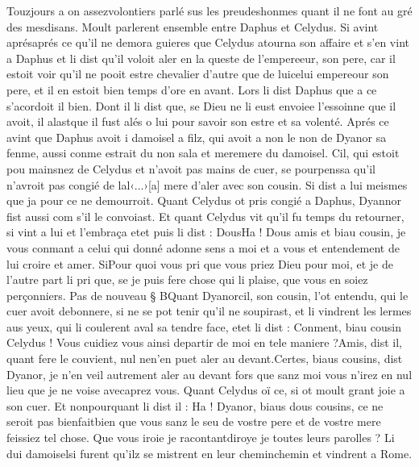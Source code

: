 \documentclass{article}
\begin{document}
\begin{pages}
      Touzjours a on assezvolontiers parlé sus les preudeshonmes quant 
      il ne font au gré des mesdisans.
   Moult parlerent ensemble entre Daphus et Celydus. 
   Si avint aprésaprés ce qu’il ne demora guieres que  
   Celydus atourna son affaire et s’en vint a 
   Daphus et li dist qu’il voloit aler en la queste de 
      l’empereeur, son pere, car il estoit voir qu’il ne pooit estre chevalier d’autre que de 
      luicelui empereour son pere, et il en estoit bien temps d’ore en avant. 
   Lors li dist Daphus que a ce s’acordoit il bien. 
   Dont il li dist 
   que, 
   se Dieu ne li eust envoiee l’essoinne que il avoit, 
      il alastque il fust alés o lui pour savoir son estre et sa volenté. 
   Aprés ce avint que Daphus avoit i damoisel a filz, 
   qui avoit a non le non de Dyanor sa fenme, 
   aussi conme estrait du non sala
      et 
   meremere du damoisel.
   Cil, qui estoit pou mainsnez de Celydus et n’avoit pas mains de cuer, se pourpenssa 
   qu’il n’avroit pas congié de lal‹...›[a] 
      mere d’aler avec son cousin. 
   Si dist a lui meismes que ja pour ce ne demourroit. \pend
\pstart Quant Celydus ot pris congié a 
   Daphus, Dyannor fist aussi com s’il le convoiast. 
   Et quant Celydus vit 
   qu’il fu temps du retourner, si vint a lui et l’embraça etet puis li dist :
   DousHa ! Dous amis et biau cousin, 
      je vous conmant a celui qui donné adonne sens a moi et a vous et 
      entendement de lui croire et amer. SiPour quoi vous pri que vous priez 
      Dieu pour moi, et je de l’autre part li pri que, se je puis fere chose qui li plaise, que vous en soiez perçonniers. \pend
\pstart Pas de nouveau § BQuant 
   Dyanorcil, son cousin, 
   l’ot entendu, qui le cuer avoit debonnere, si ne se pot tenir qu’il ne 
   soupirast, et li vindrent les lermes aus yeux, qui li coulerent aval sa tendre face, 
   etet li dist :
   Conment, biau cousin Celydus ! 
      Vous cuidiez vous ainsi departir de moi en tele maniere ?Amis, dist il, quant fere le couvient, nul 
      nen'en puet aler au devant.Certes, biaus cousins, dist Dyanor, 
   je n’en veil autrement aler au devant fors que sanz moi vous n’irez en nul lieu que je ne voise 
      avecaprez vous.
   Quant Celydus oï ce, si ot moult grant joie a son cuer. Et nonpourquant li dist il :
   Ha ! Dyanor, biaus dous cousins, ce ne seroit pas 
      bienfaitbien que 
      vous sanz le 
      seu de 
   vostre pere et de vostre mere feissiez tel chose.
   Que vous iroie je racontantdiroye je toutes 
      leurs parolles ?
   Li dui damoiselsi furent qu'ilz se mistrent en leur 
   cheminchemin et vindrent a Rome. 

\end{pages}
\end{document}
